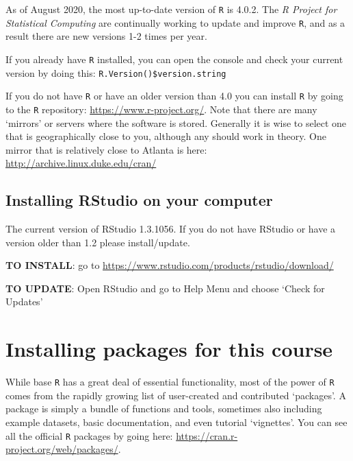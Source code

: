 \documentclass[
]{book}
\newcommand{\passthrough}[1]{#1}
\begin{document}
As of August 2020, the most up-to-date version of \passthrough{\lstinline!R!} is 4.0.2. The \emph{R Project for Statistical Computing} are continually working to update and improve \passthrough{\lstinline!R!}, and as a result there are new versions 1-2 times per year.

If you already have \passthrough{\lstinline!R!} installed, you can open the console and check your current version by doing this: \passthrough{\lstinline!R.Version()$version.string!}

If you do not have \passthrough{\lstinline!R!} or have an older version than 4.0 you can install \passthrough{\lstinline!R!} by going to the \passthrough{\lstinline!R!} repository: \url{https://www.r-project.org/}. Note that there are many `mirrors' or servers where the software is stored. Generally it is wise to select one that is geographically close to you, although any should work in theory. One mirror that is relatively close to Atlanta is here: \url{http://archive.linux.duke.edu/cran/}

\hypertarget{installing-rstudio-on-your-computer}{%
\section*{Installing RStudio on your computer}\label{installing-rstudio-on-your-computer}}

The current version of RStudio 1.3.1056. If you do not have RStudio or have a version older than 1.2 please install/update.

\textbf{TO INSTALL}: go to \url{https://www.rstudio.com/products/rstudio/download/}

\textbf{TO UPDATE}: Open RStudio and go to Help Menu and choose `Check for Updates'

\hypertarget{installing-packages-for-this-course}{%
\chapter*{Installing packages for this course}\label{installing-packages-for-this-course}}

While base \passthrough{\lstinline!R!} has a great deal of essential functionality, most of the power of \passthrough{\lstinline!R!} comes from the rapidly growing list of user-created and contributed `packages'. A package is simply a bundle of functions and tools, sometimes also including example datasets, basic documentation, and even tutorial `vignettes'. You can see all the official \passthrough{\lstinline!R!} packages by going here: \url{https://cran.r-project.org/web/packages/}.
\end{document}
